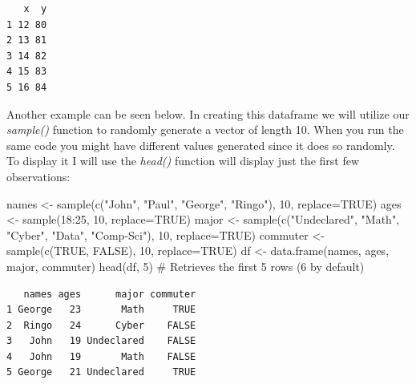 \documentclass[
  letterpaper,
  DIV=11,
  numbers=noendperiod]{scrreprt}
\newenvironment{Shaded}{\begin{snugshade}}{\end{snugshade}}
\newcommand{\AttributeTok}[1]{\textcolor[rgb]{0.40,0.45,0.13}{#1}}
\newcommand{\CommentTok}[1]{\textcolor[rgb]{0.37,0.37,0.37}{#1}}
\newcommand{\ConstantTok}[1]{\textcolor[rgb]{0.56,0.35,0.01}{#1}}
\newcommand{\DecValTok}[1]{\textcolor[rgb]{0.68,0.00,0.00}{#1}}
\newcommand{\FunctionTok}[1]{\textcolor[rgb]{0.28,0.35,0.67}{#1}}
\newcommand{\NormalTok}[1]{\textcolor[rgb]{0.00,0.23,0.31}{#1}}
\newcommand{\OtherTok}[1]{\textcolor[rgb]{0.00,0.23,0.31}{#1}}
\newcommand{\SpecialCharTok}[1]{\textcolor[rgb]{0.37,0.37,0.37}{#1}}
\newcommand{\StringTok}[1]{\textcolor[rgb]{0.13,0.47,0.30}{#1}}
\begin{document}
\begin{verbatim}
   x  y
1 12 80
2 13 81
3 14 82
4 15 83
5 16 84
\end{verbatim}

Another example can be seen below. In creating this dataframe we will
utilize our \emph{sample()} function to randomly generate a vector of
length 10. When you run the same code you might have different values
generated since it does so randomly. To display it I will use the
\emph{head()} function will display just the first few observations:

\begin{Shaded}
\begin{Highlighting}[]
\NormalTok{names }\OtherTok{\textless{}{-}} \FunctionTok{sample}\NormalTok{(}\FunctionTok{c}\NormalTok{(}\StringTok{"John"}\NormalTok{, }\StringTok{"Paul"}\NormalTok{, }\StringTok{"George"}\NormalTok{, }\StringTok{"Ringo"}\NormalTok{), }\DecValTok{10}\NormalTok{, }\AttributeTok{replace=}\ConstantTok{TRUE}\NormalTok{)}
\NormalTok{ages }\OtherTok{\textless{}{-}} \FunctionTok{sample}\NormalTok{(}\DecValTok{18}\SpecialCharTok{:}\DecValTok{25}\NormalTok{, }\DecValTok{10}\NormalTok{, }\AttributeTok{replace=}\ConstantTok{TRUE}\NormalTok{)}
\NormalTok{major }\OtherTok{\textless{}{-}} \FunctionTok{sample}\NormalTok{(}\FunctionTok{c}\NormalTok{(}\StringTok{"Undeclared"}\NormalTok{, }\StringTok{"Math"}\NormalTok{, }\StringTok{"Cyber"}\NormalTok{, }\StringTok{"Data"}\NormalTok{, }\StringTok{"Comp{-}Sci"}\NormalTok{), }\DecValTok{10}\NormalTok{, }\AttributeTok{replace=}\ConstantTok{TRUE}\NormalTok{)}
\NormalTok{commuter }\OtherTok{\textless{}{-}} \FunctionTok{sample}\NormalTok{(}\FunctionTok{c}\NormalTok{(}\ConstantTok{TRUE}\NormalTok{, }\ConstantTok{FALSE}\NormalTok{), }\DecValTok{10}\NormalTok{, }\AttributeTok{replace=}\ConstantTok{TRUE}\NormalTok{)}
\NormalTok{df }\OtherTok{\textless{}{-}} \FunctionTok{data.frame}\NormalTok{(names, ages, major, commuter)}
\FunctionTok{head}\NormalTok{(df, }\DecValTok{5}\NormalTok{) }\CommentTok{\# Retrieves the first 5 rows (6 by default)}
\end{Highlighting}
\end{Shaded}

\begin{verbatim}
   names ages      major commuter
1 George   23       Math     TRUE
2  Ringo   24      Cyber    FALSE
3   John   19 Undeclared    FALSE
4   John   19       Math    FALSE
5 George   21 Undeclared     TRUE
\end{verbatim}
\end{document}
